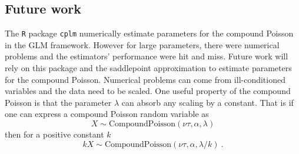 \documentclass[a4paper]{proc}
\begin{document}
\subsection{Future work}
The \texttt{R} package \texttt{cplm} \cite{zhang2013likelihood} numerically estimate parameters for the compound Poisson in the GLM framework. However for large parameters, there were numerical problems and the estimators' performance were hit and miss. Future work will rely on this package and the saddlepoint approximation to estimate parameters for the compound Poisson. Numerical problems can come from ill-conditioned variables and the data need to be scaled. One useful property of the compound Poisson is that the parameter $\lambda$ can absorb any scaling by a constant. That is if one can express a compound Poisson random variable as
\begin{equation}
X\sim\text{CompoundPoisson}\left(\nu\tau,\alpha,\lambda\right)
\end{equation}
then for a positive constant $k$
\begin{equation}
kX\sim\text{CompoundPoisson}\left(\nu\tau,\alpha,\lambda/k\right) \ .
\end{equation}



\end{document}
